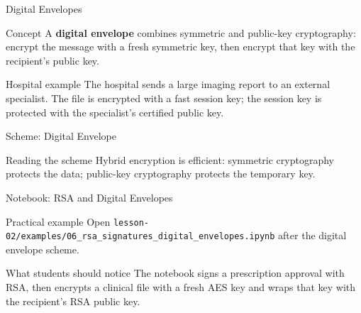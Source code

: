 \documentclass[presentation]{beamer}
\begin{document}
\begin{frame}[c]{Digital Envelopes}
\begin{block}{Concept}
A \textbf{digital envelope} combines symmetric and public-key cryptography: encrypt the message with
a fresh symmetric key, then encrypt that key with the recipient's public key.
\end{block}

\begin{exampleblock}{Hospital example}
The hospital sends a large imaging report to an external specialist. The file is encrypted with a
fast session key; the session key is protected with the specialist's certified public key.
\end{exampleblock}
\end{frame}

\begin{frame}[c]{Scheme: Digital Envelope}
\begin{center}
\end{center}

\begin{block}{Reading the scheme}
Hybrid encryption is efficient: symmetric cryptography protects the data; public-key cryptography
protects the temporary key.
\end{block}
\end{frame}

\begin{frame}[c]{Notebook: RSA and Digital Envelopes}
\begin{block}{Practical example}
Open \texttt{lesson-02/examples/06\_rsa\_signatures\_digital\_envelopes.ipynb} after the digital
envelope scheme.
\end{block}

\begin{exampleblock}{What students should notice}
The notebook signs a prescription approval with RSA, then encrypts a clinical file with a fresh AES
key and wraps that key with the recipient's RSA public key.
\end{exampleblock}
\end{frame}
\end{document}
